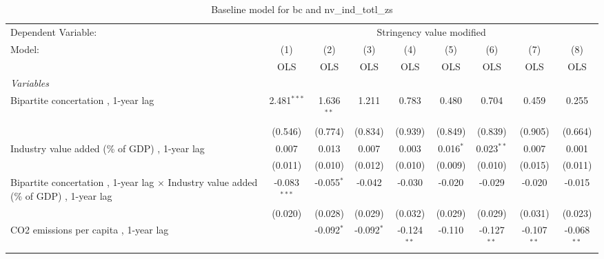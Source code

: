 
\begin{table}[htbp]
   \caption{Baseline model for bc and nv\_ind\_totl\_zs}
   \centering
   \begin{tabular}{lcccccccc}
      \toprule
      Dependent Variable: & \multicolumn{8}{c}{Stringency value modified}\\
      Model:                                                                                       & (1)            & (2)          & (3)           & (4)           & (5)           & (6)           & (7)           & (8)\\  
                                                                                                   &  OLS           & OLS          & OLS           & OLS           & OLS           & OLS           & OLS           & OLS\\  
      \midrule
      \emph{Variables}\\
      Bipartite concertation , 1-year lag                                                          & 2.481$^{***}$  & 1.636$^{**}$ & 1.211         & 0.783         & 0.480         & 0.704         & 0.459         & 0.255\\   
                                                                                                   & (0.546)        & (0.774)      & (0.834)       & (0.939)       & (0.849)       & (0.839)       & (0.905)       & (0.664)\\   
      Industry value added (\% of GDP) , 1-year lag                                                & 0.007          & 0.013        & 0.007         & 0.003         & 0.016$^{*}$   & 0.023$^{**}$  & 0.007         & 0.001\\   
                                                                                                   & (0.011)        & (0.010)      & (0.012)       & (0.010)       & (0.009)       & (0.010)       & (0.015)       & (0.011)\\   
      Bipartite concertation , 1-year lag $\times$ Industry value added (\% of GDP) , 1-year lag   & -0.083$^{***}$ & -0.055$^{*}$ & -0.042        & -0.030        & -0.020        & -0.029        & -0.020        & -0.015\\   
                                                                                                   & (0.020)        & (0.028)      & (0.029)       & (0.032)       & (0.029)       & (0.029)       & (0.031)       & (0.023)\\   
      CO2 emissions per capita , 1-year lag                                                        &                & -0.092$^{*}$ & -0.092$^{*}$  & -0.124$^{**}$ & -0.110        & -0.127$^{**}$ & -0.107$^{**}$ & -0.068$^{**}$\\   

\end{tabular}
\end{table}
